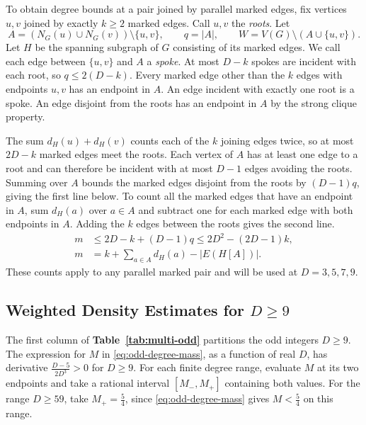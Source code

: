 \documentclass[preprint,11pt,numbers]{elsarticle-arxiv}
\numberwithin{equation}{section}
\theoremstyle{definition}
\begin{document}
To obtain degree bounds at a pair joined by parallel marked edges,
fix vertices $u,v$ joined by exactly $k\geq2$ marked edges. Call
$u,v$ the \emph{roots}. Let
\[
 A=(N_G(u)\cup N_G(v))\setminus\{u,v\},\qquad
 q=|A|,\qquad W=V(G)\setminus(A\cup\{u,v\}).
\]
Let $H$ be the spanning subgraph of $G$ consisting of its marked
edges. We call each edge between $\{u,v\}$ and $A$ a \emph{spoke}.
At most $D-k$ spokes are incident with each root, so
$q\leq2(D-k)$. Every marked edge other than the $k$ edges with
endpoints $u,v$ has an endpoint in $A$. An edge incident with
exactly one root is a spoke. An edge disjoint from the roots
has an endpoint in $A$ by the strong clique property.

The sum $d_H(u)+d_H(v)$ counts each of the $k$ joining edges
twice, so at most $2D-k$ marked edges meet the roots. Each
vertex of $A$ has at least one edge to a root and can therefore
be incident with at most $D-1$ edges avoiding the roots.
Summing over $A$ bounds the marked edges disjoint from the
roots by $(D-1)q$, giving the first line below. To count all the
marked edges that have an endpoint in $A$, sum $d_H(a)$ over
$a\in A$ and subtract one for each marked edge with both
endpoints in $A$. Adding the $k$ edges between the roots gives
the second line.
\begin{equation}\label{eq:odd-degree-root-count}
\begin{aligned}
 m&\leq 2D-k+(D-1)q\leq 2D^2-(2D-1)k,\\
 m&=k+\sum_{a\in A}d_H(a)-|E(H[A])|.
\end{aligned}
\end{equation}
These counts apply to any parallel marked pair and will be used
at $D=3,5,7,9$.

\subsection{Weighted Density Estimates for \texorpdfstring{$D\geq9$}{D at least 9}}
\label{subsec:exact-large-degree}

The first column of \textbf{Table~\ref{tab:multi-odd}} partitions
the odd integers $D\geq9$. The expression for $M$ in
\eqref{eq:odd-degree-mass}, as a function of real $D$, has
derivative $\frac{D-5}{2D^3}>0$ for $D\geq9$. For each finite
degree range, evaluate $M$ at its two endpoints and take a
rational interval $[M_-,M_+]$ containing both values. For the
range $D\geq59$, take $M_+=\frac54$, since
\eqref{eq:odd-degree-mass} gives $M<\frac54$ on this range.
\end{document}
